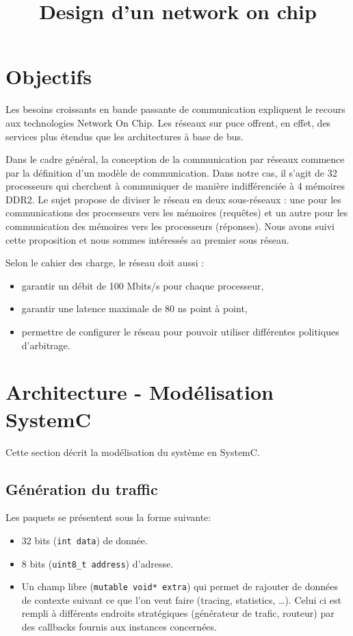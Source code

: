 \documentclass[11pt]{article}
\title{Design d'un network on chip}
\begin{document}
\maketitle

\section{Objectifs}

Les besoins croissants en bande passante de communication expliquent le recours
aux technologies Network On Chip. Les réseaux sur puce offrent, en effet, des
services plus étendus que les architectures à base de bus.


Dans le cadre général, la conception de la communication par réseaux commence
par la définition d'un modèle de communication. Dans notre cas, il s'agit de 32
processeurs qui cherchent à communiquer de manière indifférenciée à 4 mémoires
DDR2. Le sujet propose de diviser le réseau en deux sous-réseaux : une pour les
communications des processeurs vers les mémoires (requêtes) et un autre pour les
communication des mémoires vers les processeurs (réponses). Nous avons suivi
cette proposition et nous sommes intéressés au premier sous réseau.


Selon le cahier des charge, le réseau doit aussi :
\begin{itemize}
  \item garantir un débit de 100 Mbits/s pour chaque processeur,
  \item garantir une latence maximale de 80 ns point à point,
  \item permettre de configurer le réseau pour pouvoir utiliser différentes
    politiques d'arbitrage.
\end{itemize}

\section{Architecture - Modélisation SystemC}

Cette section décrit la modélisation du système en SystemC.

\subsection{Génération du traffic}

Les paquets se présentent sous la forme suivante:
\begin{itemize}
  \item 32 bits (\texttt{int data}) de donnée.
  \item 8 bits (\texttt{uint8\_t address}) d'adresse.
  \item Un champ libre (\texttt{mutable void* extra}) qui permet de rajouter de
    données de contexte suivant ce que l'on veut faire (tracing, statistics,
    \ldots). Celui ci est rempli à différents endroits stratégiques
    (générateur de trafic, routeur) par des callbacks fournis aux instances
    concernées.
\end{itemize}
\end{document}
